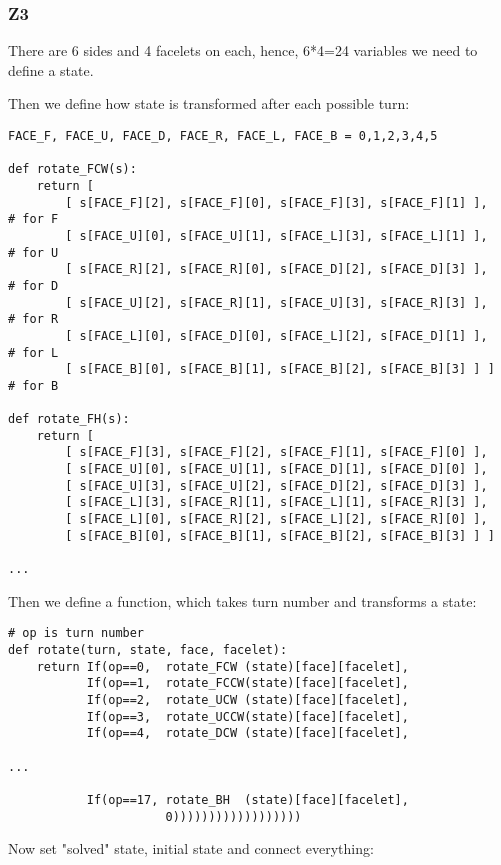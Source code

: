 \subsubsection{Z3}

There are 6 sides and 4 facelets on each, hence, 6*4=24 variables we need to define a state.

Then we define how state is transformed after each possible turn:

\begin{lstlisting}
FACE_F, FACE_U, FACE_D, FACE_R, FACE_L, FACE_B = 0,1,2,3,4,5

def rotate_FCW(s):
    return [
        [ s[FACE_F][2], s[FACE_F][0], s[FACE_F][3], s[FACE_F][1] ],   # for F
        [ s[FACE_U][0], s[FACE_U][1], s[FACE_L][3], s[FACE_L][1] ],   # for U
        [ s[FACE_R][2], s[FACE_R][0], s[FACE_D][2], s[FACE_D][3] ],   # for D
        [ s[FACE_U][2], s[FACE_R][1], s[FACE_U][3], s[FACE_R][3] ],   # for R
        [ s[FACE_L][0], s[FACE_D][0], s[FACE_L][2], s[FACE_D][1] ],   # for L
        [ s[FACE_B][0], s[FACE_B][1], s[FACE_B][2], s[FACE_B][3] ] ]  # for B

def rotate_FH(s):
    return [
        [ s[FACE_F][3], s[FACE_F][2], s[FACE_F][1], s[FACE_F][0] ],
        [ s[FACE_U][0], s[FACE_U][1], s[FACE_D][1], s[FACE_D][0] ],
        [ s[FACE_U][3], s[FACE_U][2], s[FACE_D][2], s[FACE_D][3] ],
        [ s[FACE_L][3], s[FACE_R][1], s[FACE_L][1], s[FACE_R][3] ],
        [ s[FACE_L][0], s[FACE_R][2], s[FACE_L][2], s[FACE_R][0] ],
        [ s[FACE_B][0], s[FACE_B][1], s[FACE_B][2], s[FACE_B][3] ] ]

...
\end{lstlisting}

Then we define a function, which takes turn number and transforms a state:

\begin{lstlisting}
# op is turn number
def rotate(turn, state, face, facelet):
    return If(op==0,  rotate_FCW (state)[face][facelet],
           If(op==1,  rotate_FCCW(state)[face][facelet],
           If(op==2,  rotate_UCW (state)[face][facelet],
           If(op==3,  rotate_UCCW(state)[face][facelet],
           If(op==4,  rotate_DCW (state)[face][facelet],

...

           If(op==17, rotate_BH  (state)[face][facelet],
                      0))))))))))))))))))
\end{lstlisting}

Now set "solved" state, initial state and connect everything:

